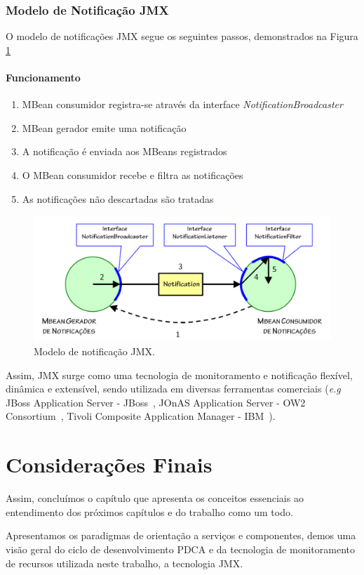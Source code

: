 \subsubsection{Modelo de Notificação JMX}
O modelo de notificações JMX segue os seguintes passos, demonstrados na Figura \ref{fig:notifyjmx}

\paragraph{Funcionamento} 
\begin{enumerate}
\item MBean consumidor registra-se através da interface \textit{NotificationBroadcaster}

\item MBean gerador emite uma notificação

\item A notificação é enviada aos MBeans registrados

\item O MBean consumidor recebe e filtra as notificações

\item As notificações não descartadas são tratadas
\end{enumerate}

\begin{figure}[htp]
\centering
\includegraphics[width=13cm]{chapters/chapter4/notification_model.png}
\caption[Modelo de notificação JMX]{Modelo de notificação JMX.}
\label{fig:notifyjmx}
\end{figure}

Assim, JMX surge como uma tecnologia de monitoramento e notificação flexível, dinâmica e extensível, sendo utilizada em diversas ferramentas comerciais (\textit{e.g } JBoss Application Server - JBoss~\cite{jboss}, JOnAS Application Server - OW2 Consortium~\cite{jonas}, Tivoli Composite Application Manager - IBM~\cite{tivoli}). 

\section{Considerações Finais}
Assim, concluímos o capítulo que apresenta os conceitos essenciais ao entendimento dos próximos capítulos e do trabalho como um todo.

Apresentamos os paradigmas de orientação a serviços e componentes, demos uma visão geral do ciclo de desenvolvimento PDCA e da tecnologia de monitoramento de recursos utilizada neste trabalho, a tecnologia JMX.